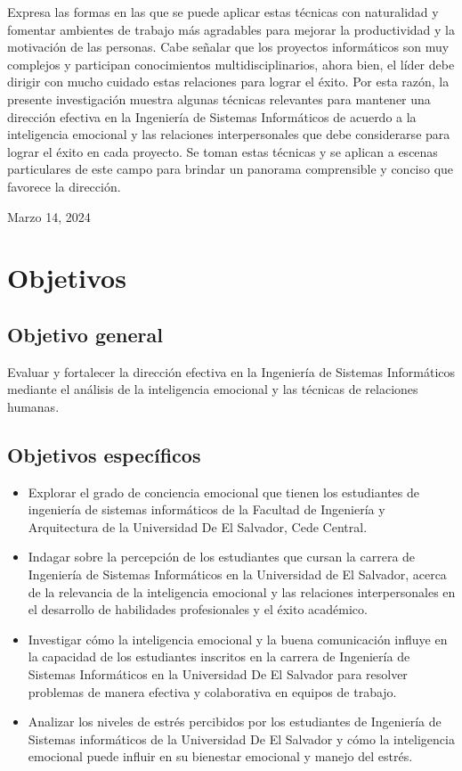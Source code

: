 \documentclass[journal]{IEEEtran}
\begin{document}
Expresa las formas en las que se puede aplicar estas técnicas con naturalidad y fomentar ambientes de trabajo más agradables para mejorar la productividad y la motivación de las personas. Cabe señalar que los proyectos informáticos son muy complejos y participan conocimientos multidisciplinarios, ahora bien, el líder debe dirigir con mucho cuidado estas relaciones para lograr el éxito. Por esta razón, la presente investigación muestra algunas técnicas relevantes para mantener una dirección efectiva en la Ingeniería de Sistemas Informáticos de acuerdo a la inteligencia emocional y las relaciones interpersonales que debe considerarse para lograr el éxito en cada proyecto. Se toman estas técnicas y se aplican a escenas particulares de este campo para brindar un panorama comprensible y conciso que favorece la dirección.

\hfill Marzo 14, 2024

\section{Objetivos}

\subsection{Objetivo general}
Evaluar y fortalecer la dirección efectiva en la Ingeniería de Sistemas Informáticos mediante el análisis de la inteligencia emocional y las técnicas de relaciones humanas.

\subsection{Objetivos específicos}
\begin{itemize}
	\item Explorar el grado de conciencia emocional que tienen los estudiantes de ingeniería de sistemas informáticos de la Facultad de Ingeniería y Arquitectura de la Universidad De El Salvador, Cede Central.
	\item Indagar sobre la percepción de los estudiantes que cursan la carrera de Ingeniería de Sistemas Informáticos en la Universidad de El Salvador, acerca de la relevancia de la inteligencia emocional y las relaciones interpersonales en el desarrollo de habilidades profesionales y el éxito académico.
	\item Investigar cómo la inteligencia emocional y la buena comunicación influye en la capacidad de los estudiantes inscritos en la carrera de Ingeniería de Sistemas Informáticos en la Universidad De El Salvador para resolver problemas de manera efectiva y colaborativa en equipos de trabajo.
	\item Analizar los niveles de estrés percibidos por los estudiantes de Ingeniería de Sistemas informáticos de la Universidad De El Salvador y cómo la inteligencia emocional puede influir en su bienestar emocional y manejo del estrés.
\end{itemize}
\end{document}
